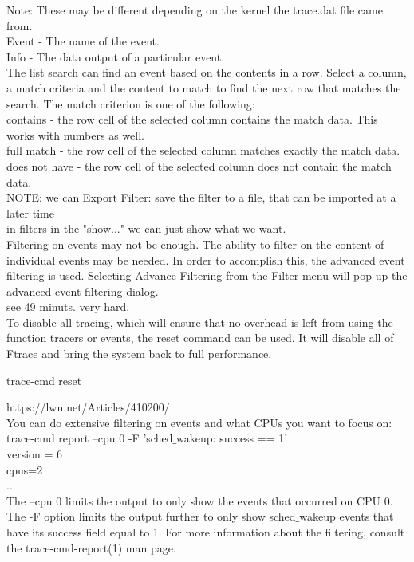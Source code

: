 \documentclass[11pt, a4paper, oneside]{article}
\theoremstyle{definition}
\begin{document}
    Note: These may be different depending on the kernel the trace.dat file came from.\\
    Event - The name of the event.\\
    Info - The data output of a particular event. \\

The list search can find an event based on the contents in a row. Select a column, a match criteria and the content to match to find the next row that matches the search. The match criterion is one of the following:\\

    contains - the row cell of the selected column contains the match data. This works with numbers as well.\\
    full match - the row cell of the selected column matches exactly the match data.\\
    does not have - the row cell of the selected column does not contain the match data. \\

NOTE: we can Export Filter: save the filter to a file, that can be imported at a later time\\
in filters in the "show..." we can just show what we want.\\

Filtering on events may not be enough. The ability to filter on the content of individual events may be needed. In order to accomplish this, the advanced event filtering is used. Selecting Advance Filtering from the Filter menu will pop up the advanced event filtering dialog. \\

see 49 minuts. very hard.\\

To disable all tracing, which will ensure that no overhead is left from using the function tracers or events, the reset command can be used. It will disable all of Ftrace and bring the system back to full performance.

trace-cmd reset

https://lwn.net/Articles/410200/\\

 You can do extensive filtering on events and what CPUs you want to focus on:
\\
     trace-cmd report --cpu 0 -F 'sched$\_$wakeup: success == 1'\\
    version = 6\\
    cpus=2\\
..\\
The --cpu 0 limits the output to only show the events that occurred on CPU 0. The -F option limits the output further to only show sched$\_$wakeup events that have its success field equal to 1. For more information about the filtering, consult the trace-cmd-report(1) man page.\\ 
	
\end{document}
